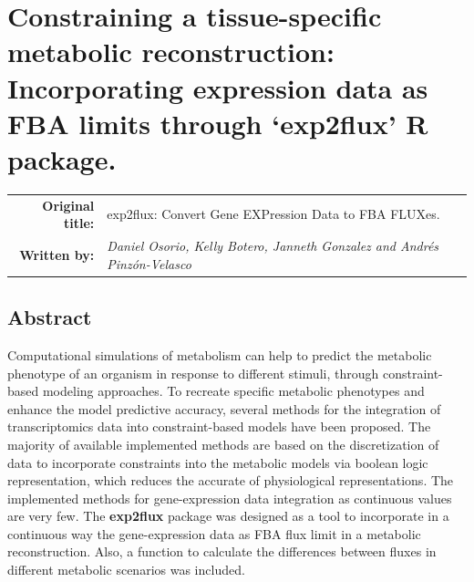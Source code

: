 \chapter[exp2flux: Convert Gene EXPression Data to FBA FLUXes.]{Constraining a tissue-specific metabolic reconstruction:  Incorporating expression data as FBA limits through `exp2flux' R package.}
\begin{tabular}{rm{13cm}}
\textsf{\textbf{Original title:}}& 	exp2flux: Convert Gene EXPression Data to FBA FLUXes.\\
\textsf{\textbf{Written by:}} & \textit{Daniel Osorio, Kelly Botero, Janneth Gonzalez and Andrés Pinzón-Velasco}\\ 
\end{tabular}
\section*{Abstract}
Computational simulations of metabolism can help to predict the metabolic phenotype of an organism in response to different stimuli, through constraint-based modeling approaches. To recreate specific metabolic phenotypes and enhance the model predictive accuracy, several methods for the integration of transcriptomics data into constraint-based models have been proposed.  The majority of available implemented methods are based on the discretization of data to incorporate constraints into the metabolic models via boolean logic representation, which reduces the accurate of physiological representations. The implemented methods for gene-expression data integration as continuous values are very few. The \textbf{exp2flux} package was designed as a tool to incorporate in a continuous way the gene-expression data as FBA flux limit in a metabolic reconstruction. Also, a function to calculate the differences between fluxes in different metabolic scenarios was included.
